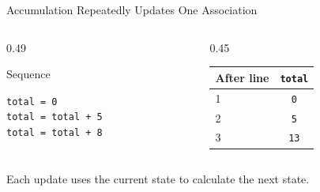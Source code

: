 \documentclass[aspectratio=169,10pt]{beamer}
\begin{document}
\begin{frame}{Accumulation Repeatedly Updates One Association}

  \begin{columns}[T,onlytextwidth]

    \begin{column}{0.49\textwidth}

      \begin{block}{Sequence}

        \texttt{total = 0}\\
        \texttt{total = total + 5}\\
        \texttt{total = total + 8}

      \end{block}

    \end{column}

    \begin{column}{0.45\textwidth}

      \begin{center}
      \renewcommand{\arraystretch}{1.35}
      \begin{tabular}{l|c}
        \textbf{After line} & \textbf{\texttt{total}} \\\hline
        1 & \texttt{0} \\
        2 & \texttt{5} \\
        3 & \texttt{13}
      \end{tabular}
      \end{center}

    \end{column}

  \end{columns}

  \begin{keyidea}

    Each update uses the current state to calculate the next state.

  \end{keyidea}

\end{frame}
\end{document}
